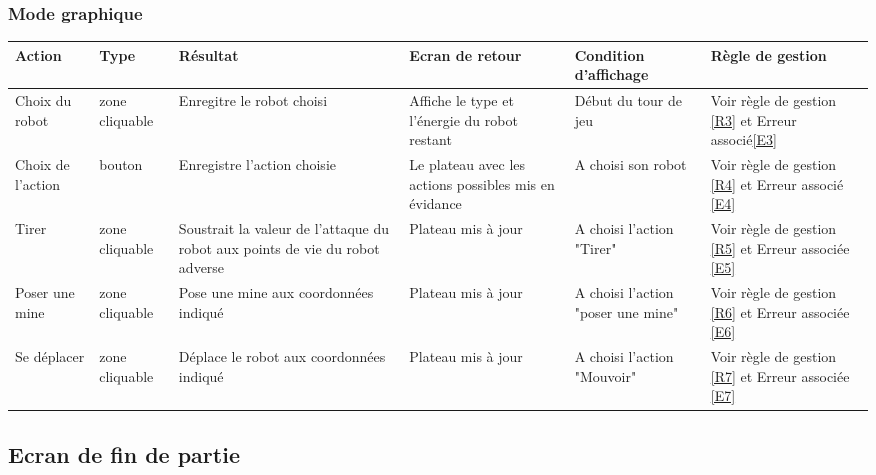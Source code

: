 \documentclass[12pt,a4paper]{article}
\begin{document}
\begin{itemize}
			\subsubsection{Mode graphique}
					\hspace{-3cm}
					\begin{tabular}{|p{2.5cm}|p{2cm}|p{3cm}|p{2.5cm}|p{3cm}|p{3cm}|} %
						\hline
						Action 					& Type 							& Résultat              		& Ecran de retour   		& Condition d'affichage & Règle de gestion \\
						\hline \hline
						Choix du robot			& zone cliquable & Enregitre le robot choisi		& Affiche le type et l'énergie du robot restant & Début du tour de jeu 	& Voir règle de gestion \ref{R3} et Erreur associé\ref{E3}			\\
						\hline
						Choix de l'action 		& bouton & Enregistre l'action choisie 	& Le plateau avec les actions possibles mis en évidance & A choisi son robot	& Voir règle de gestion \ref{R4}  et Erreur associé \ref{E4}			\\ 
						\hline
						Tirer 					& zone cliquable & Soustrait la valeur de l'attaque du robot aux points de vie du robot adverse & Plateau mis à jour	& A choisi l'action	"Tirer" &  Voir règle de gestion \ref{R5} et Erreur associée \ref{E5}\\
						\hline
						Poser une mine 			& zone cliquable & Pose une mine aux coordonnées indiqué & Plateau mis à jour & A choisi l'action "poser une mine" & Voir règle de gestion \ref{R6} et Erreur associée \ref{E6} 		\\
						\hline
						Se déplacer 			& zone cliquable & Déplace le robot aux coordonnées indiqué & Plateau mis à jour & A choisi l'action "Mouvoir" & Voir règle de gestion \ref{R7} et Erreur associée \ref{E7} \\
						\hline
					\end{tabular}
					\label{Action possible sur l'écran de jeu graphique}

		\subsection{Ecran de fin de partie}

\end{itemize}
\end{document}
